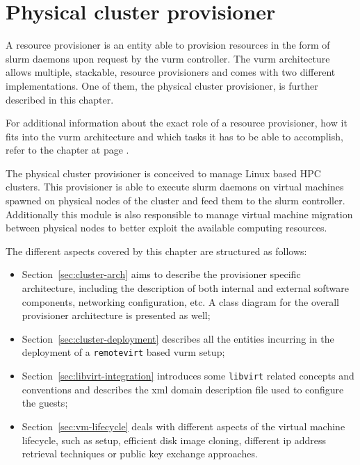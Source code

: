 \chapter{Physical cluster provisioner}
\label{sec:remotevirt}

A resource provisioner is an entity able to provision resources in the form of \gls{slurm} daemons upon request by the \gls{vurm} controller. The \gls{vurm} architecture allows multiple, stackable, resource provisioners and comes with two different implementations. One of them, the physical cluster provisioner, is further described in this chapter.

For additional information about the exact role of a resource provisioner, how it fits into the \gls{vurm} architecture and which tasks it has to be able to accomplish, refer to the \emph{} chapter at page \pageref{sec:architecture}.

The physical cluster provisioner is conceived to manage Linux based HPC clusters. This provisioner is able to execute \gls{slurm} daemons on virtual machines spawned on physical nodes of the cluster and feed them to the \gls{slurm} controller. Additionally this module is also responsible to manage virtual machine migration between physical nodes to better exploit the available computing resources.

The different aspects covered by this chapter are structured as follows:

\begin{itemize}
	\item Section~\ref{sec:cluster-arch} aims to describe the provisioner specific architecture, including the description of both internal and external software components, networking configuration, etc. A class diagram for the overall provisioner architecture is presented as well;
	\item Section~\ref{sec:cluster-deployment} describes all the entities incurring in the deployment of a \texttt{remotevirt} based \gls{vurm} setup;
	\item Section~\ref{sec:libvirt-integration} introduces some \texttt{libvirt} related concepts and conventions and describes the \gls{xml} domain description file used to configure the guests;
	\item Section~\ref{sec:vm-lifecycle} deals with different aspects of the virtual machine lifecycle, such as setup, efficient disk image cloning, different \gls{ip} address retrieval techniques or public key exchange approaches.
\end{itemize}

